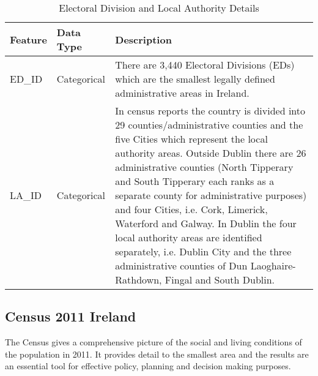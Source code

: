 \begin{table}[H]
	\centering
	\label{my-label}
	\begin{tabular}{|l|l|p{10cm}|}
		\hline
		\textbf{Feature} & \textbf{Data Type} & \textbf{Description}                                                                                                                                                                                                                                                                                                                                                                                                                                                                                                                              \\ \hline
		ED\_ID           & Categorical        & There are 3,440 Electoral Divisions (EDs) which are the smallest legally defined administrative areas in Ireland.                                                                                                                                                                                                                                                                                                                                                                             \\ \hline
		LA\_ID           & Categorical        & In census reports the country is divided into 29 counties/administrative counties and the five Cities which represent the local authority areas. Outside Dublin there are 26 administrative counties (North Tipperary and South Tipperary each ranks as a separate county for administrative purposes) and four Cities, i.e. Cork, Limerick, Waterford and Galway. In Dublin the four local authority areas are identified separately, i.e. Dublin City and the three administrative counties of Dun Laoghaire-Rathdown, Fingal and South Dublin. \\ \hline
	\end{tabular}
	\caption{Electoral Division and Local Authority Details }
\end{table}


\subsection{Census 2011 Ireland}
The Census gives a comprehensive picture of the social and living conditions of the population in 2011. It provides detail to the smallest area and the results are an essential tool for effective policy, planning and decision making purposes. 

